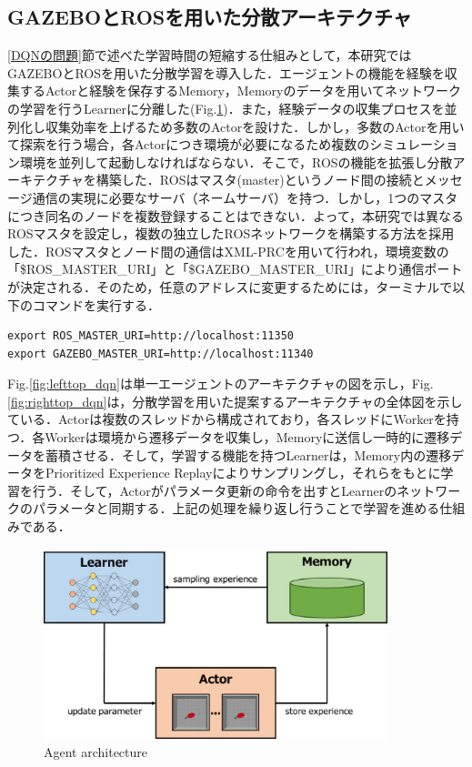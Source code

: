 \documentclass[12pt]{sonota/aislab}
\begin{document}
\subsection{GAZEBOとROSを用いた分散アーキテクチャ}
\ref{DQNの問題}節で述べた学習時間の短縮する仕組みとして，本研究ではGAZEBOとROSを用いた分散学習を導入した．エージェントの機能を経験を収集するActorと経験を保存するMemory，Memoryのデータを用いてネットワークの学習を行うLearnerに分離した(Fig.\ref{agent_architecture})．また，経験データの収集プロセスを並列化し収集効率を上げるため多数のActorを設けた．しかし，多数のActorを用いて探索を行う場合，各Actorにつき環境が必要になるため複数のシミュレーション環境を並列して起動しなければならない．そこで，ROSの機能を拡張し分散アーキテクチャを構築した．ROSはマスタ(master)というノード間の接続とメッセージ通信の実現に必要なサーバ（ネームサーバ）を持つ．しかし，1つのマスタにつき同名のノードを複数登録することはできない．よって，本研究では異なるROSマスタを設定し，複数の独立したROSネットワークを構築する方法を採用した．ROSマスタとノード間の通信はXML-PRCを用いて行われ，環境変数の「\$ROS\_MASTER\_URI」と「\$GAZEBO\_MASTER\_URI」により通信ポートが決定される．そのため，任意のアドレスに変更するためには，ターミナルで以下のコマンドを実行する．

\begin{lstlisting}[basicstyle=\ttfamily\footnotesize, frame=single]
export ROS_MASTER_URI=http://localhost:11350
export GAZEBO_MASTER_URI=http://localhost:11340
\end{lstlisting}

Fig.\ref{fig:lefttop_dqn}は単一エージェントのアーキテクチャの図を示し，Fig.\ref{fig:righttop_dqn}は，分散学習を用いた提案するアーキテクチャの全体図を示している．Actorは複数のスレッドから構成されており，各スレッドにWorkerを持つ．各Workerは環境から遷移データを収集し，Memoryに送信し一時的に遷移データを蓄積させる．そして，学習する機能を持つLearnerは，Memory内の遷移データをPrioritized Experience Replayによりサンプリングし，それらをもとに学習を行う．そして，Actorがパラメータ更新の命令を出すとLearnerのネットワークのパラメータと同期する．上記の処理を繰り返し行うことで学習を進める仕組みである．

\begin{figure}[t]
\begin{center}
\includegraphics[clip, width=10cm]{figs/apex_agent_structure.eps}
\caption{Agent architecture}
\label{agent_architecture}
\end{center}
\end{figure}
\end{document}
